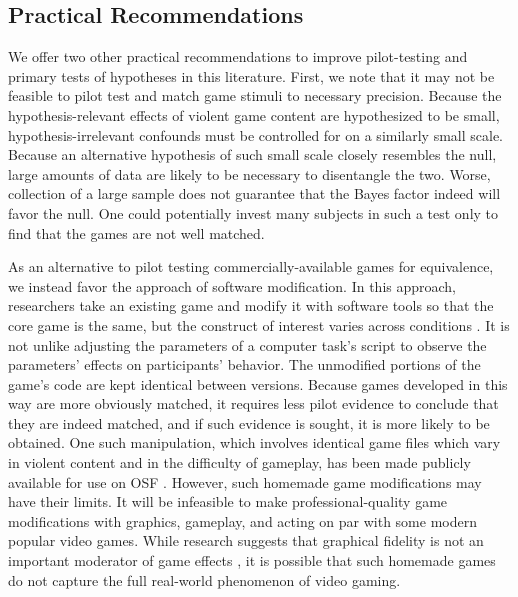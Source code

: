 \documentclass[man]{apa6}
\begin{document}
\subsection{Practical Recommendations}
We offer two other practical recommendations to improve pilot-testing and primary tests of hypotheses in this literature. First, we note that it may not be feasible to pilot test and match game stimuli to necessary precision. Because the hypothesis-relevant effects of violent game content are hypothesized to be small, hypothesis-irrelevant confounds must be controlled for on a similarly small scale. Because an alternative hypothesis of such small scale closely resembles the null, large amounts of data are likely to be necessary to disentangle the two. Worse, collection of a large sample does not guarantee that the Bayes factor indeed will favor the null. One could potentially invest many subjects in such a test only to find that the games are not well matched. 

As an alternative to pilot testing commercially-available games for equivalence, we instead favor the approach of software modification. In this approach, researchers take an existing game and modify it with software tools so that the core game is the same, but the construct of interest varies across conditions \citep[see][]{Elson:Quandt:2014}. It is not unlike adjusting the parameters of a computer task's script to observe the parameters' effects on participants' behavior. The unmodified portions of the game's code are kept identical between versions. Because games developed in this way are more obviously matched, it requires less pilot evidence to conclude that they are indeed matched, and if such evidence is sought, it is more likely to be obtained. One such manipulation, which involves identical game files which vary in violent content and in the difficulty of gameplay, has been made publicly available for use on OSF \citep{Hilgard:2014}. However, such homemade game modifications may have their limits. It will be infeasible to make professional-quality game modifications with graphics, gameplay, and acting on par with some modern popular video games. While research suggests that graphical fidelity is not an important moderator of game effects \citep{Ivory:Kalyanaraman:2007}, it is possible that such homemade games do not capture the full real-world phenomenon of video gaming.
\end{document}
